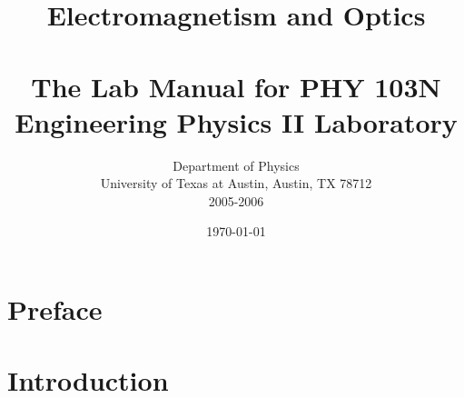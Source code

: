 \documentclass[12pt,letterpaper]{book}
\title{{\huge Electromagnetism and Optics} \\ 
\ \\
{\Large \bf The Lab Manual for PHY 103N \\
Engineering Physics II Laboratory }}
\author{ Department of Physics \\ 
 University of Texas at Austin, Austin, TX 78712\\
2005-2006}
\date{\today}
\begin{document}
\maketitle

\renewcommand{\thepage}{\roman{page}}

\tableofcontents

\renewcommand{\chaptername}{}
\renewcommand{\thechapter}{}

\chapter{Preface}  %


\renewcommand{\chaptername}{Chapter}

\renewcommand{\thepage}{\arabic{page}}
\setcounter{page}{0}

\renewcommand{\thechapter}{0}

\chapter{Introduction}
\label{ch:intro}


  \renewcommand{\thechapter}{\arabic{chapter}}
  \setcounter{chapter}{0}


% 

% 

% 

% 
\end{document}
